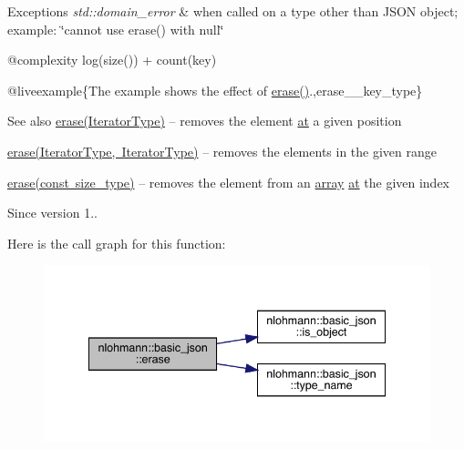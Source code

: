 \begin{DoxyExceptions}{Exceptions}
{\em std\+::domain\+\_\+error} & when called on a type other than J\+S\+ON object; example\+: {\ttfamily \char`\"{}cannot use erase() with null\char`\"{}}\\
\hline
\end{DoxyExceptions}
@complexity {\ttfamily log(size()) + count(key)}

@liveexample\{The example shows the effect of {\ttfamily \mbox{\hyperlink{classnlohmann_1_1basic__json_a068a16e76be178e83da6a192916923ed}{erase()}}}.,erase\+\_\+\+\_\+key\+\_\+type\}

\begin{DoxySeeAlso}{See also}
\mbox{\hyperlink{classnlohmann_1_1basic__json_a068a16e76be178e83da6a192916923ed}{erase(\+Iterator\+Type)}} -- removes the element \mbox{\hyperlink{classnlohmann_1_1basic__json_a73ae333487310e3302135189ce8ff5d8}{at}} a given position 

\mbox{\hyperlink{classnlohmann_1_1basic__json_a4b3f7eb2d4625d95a51fbbdceb7c5f39}{erase(\+Iterator\+Type, Iterator\+Type)}} -- removes the elements in the given range 

\mbox{\hyperlink{classnlohmann_1_1basic__json_a88cbcefe9a3f4d294bed0653550a5cb9}{erase(const size\+\_\+type)}} -- removes the element from an \mbox{\hyperlink{classnlohmann_1_1basic__json_a4a4ec75e4d2845d9bcf7a9e5458e4949}{array}} \mbox{\hyperlink{classnlohmann_1_1basic__json_a73ae333487310e3302135189ce8ff5d8}{at}} the given index
\end{DoxySeeAlso}
\begin{DoxySince}{Since}
version 1.. 
\end{DoxySince}
Here is the call graph for this function\+:\nopagebreak
\begin{figure}[H]
\begin{center}
\leavevmode
\includegraphics[width=341pt]{classnlohmann_1_1basic__json_a2f8484d69c55d8f2a9697a7bec29362a_cgraph}
\end{center}
\end{figure}
